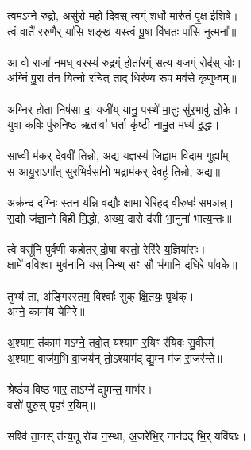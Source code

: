 \subsection{}
\\
त्वम॑ऽग्ने रु॒द्रो, असु॑रो म॒हो दि॒वस् त्वग्ं शर्धो॒ मारु॑तं पृ॒क्ष ई॑शिषे।\\
त्वं वातै॑ ररु॒णैर् या॑सि शङ्ख॒ यस्त्वं पू॒षा वि॑ध॒तः पा॑सि॒ नुत्मना᳚॥ \\
\\
आ वो॒ राजा॑ नमध् व॒रस्य॑ रु॒द्रग्ं होता॑रग्ं सत्य॒ यज॒ग्ं॒ रोद॑स् योः।\\
अ॒ग्निं पु॒रा त॑न यि॒त्नो र॒चित् ता॒द् धिर॑ण्य रूप॒ मव॑से कृणुध्वम्॥\\
\\
अग्निर् होता निष॑सा दा॒ यजी॑य् यानु॒ पस्थे॑ मा॒तुः सु॑र॒भावु॑ लो॒के। \\
युवा॑ क॒विः पु॑रुनि॒ष्ठ ऋ॒तावा॑ ध॒र्ता  कृ॑ष्टी॒ नामु॒त मध्य॑ इ॒द्धः।\\
\\
सा॒ध्वी म॑कर् दे॒ववी॑ तिन्नो, अ॒द्य य॒ज्ञस्य॑ जि॒ह्वाम॑ विदाम॒ गुह्या᳚म्\\
स आयु॒राऽगा᳚त् सुर॒भिर्वसा॑नो भ॒द्राम॑कर् दे॒वहू॑ तिन्नो, अ॒द्य॥\\
\\
अक्र॑न्द द॒ग्निः स्त॒न य॑न्नि व॒द्यौः क्षामा॒ रेरि॑हद् वी॒रुधः॑ सम॒ञन्न्।\\
स॒द्यो ज॑ज्ञा॒नो विही मि॒द्धो, अख्य॒ दारो द॑सी भा॒नुना॑ भात्य॒न्तः॥\\
\\
त्वे वसू॑नि पुर्वणी कहोतर् दो॒षा वस्तो॒ रेरि॑रे य॒ज्ञिया॑सः।\\
क्षामे॑ व॒विश्वा॒ भुव॑नानि॒ यस् मि॒न्थ् सꣳ सौ भ॑गानि दधि॒रे पा॑व॒के॥\\
\\
तुभ्यं ता, अ॑ङ्गिरस्तम॒ विश्वाः᳚ सुक् क्षि॒तयः॒ पृथ॑क्।\\
अग्ने॒ कामा॑य येमिरे॥\\
\\
अ॒श्याम॒ तंकाम॑ मऽग्ने॒ तवो॒त् य॑श्याम॑ र॒यिꣳ र॑यिवः सु॒वीरम्᳚\\
अ॒श्याम॒ वाज॑म॒भि वा॒जय॑न् तो॒ऽश्याम॑द्  द्यु॒म्न म॑ज रा॒जर॑न्ते॥\\
\\
श्रेष्ठं॑य विष्ठ भार॒ ताऽग्ने᳚ द्युमन्त॒ माभ॑र।\\
वसो॑ पुरु॒स् पृहꣳ॑ र॒यिम्॥\\
 \\
सश्वि॑ ता॒नस् त॑न्य॒तू रो॑च न॒स्था, अ॒जरे॑भि॒र् नान॑दद् भि॒र् यवि॑ष्ठः।\\
